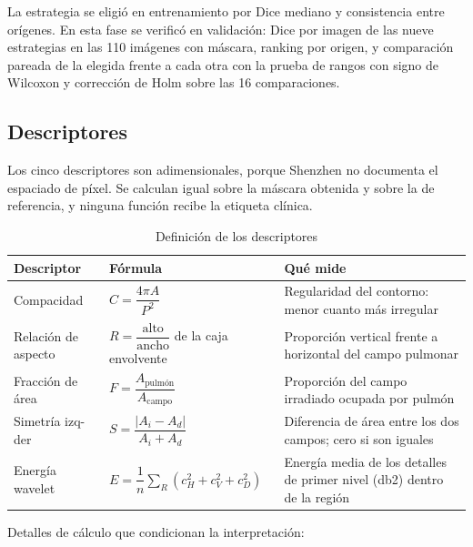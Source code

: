 La estrategia se eligió en entrenamiento por Dice mediano y consistencia entre
orígenes. En esta fase se verificó en validación: Dice por imagen de las nueve
estrategias en las 110 imágenes con máscara, ranking por origen, y comparación
pareada de la elegida frente a cada otra con la prueba de rangos con signo de
Wilcoxon y corrección de Holm sobre las 16 comparaciones.

\subsection{Descriptores}
\label{sec:met-descriptores}

Los cinco descriptores son adimensionales, porque Shenzhen no documenta el
espaciado de píxel. Se calculan igual sobre la máscara obtenida y sobre la de
referencia, y ninguna función recibe la etiqueta clínica.

\begin{table}[H]
\centering
\small
\caption{Definición de los descriptores}
\begin{tabular}{@{}p{3.5cm}p{4.6cm}p{5.6cm}@{}}
\toprule
\textbf{Descriptor} & \textbf{Fórmula} & \textbf{Qué mide} \\
\midrule
Compacidad & $C = \dfrac{4\pi A}{P^2}$ & Regularidad del contorno: menor cuanto
más irregular \\
\addlinespace
Relación de aspecto & $R = \dfrac{\text{alto}}{\text{ancho}}$ de la caja envolvente &
Proporción vertical frente a horizontal del campo pulmonar \\
\addlinespace
Fracción de área & $F = \dfrac{A_{\text{pulmón}}}{A_{\text{campo}}}$ & Proporción
del campo irradiado ocupada por pulmón \\
\addlinespace
Simetría izq-der & $S = \dfrac{|A_i - A_d|}{A_i + A_d}$ & Diferencia de área entre
los dos campos; cero si son iguales \\
\addlinespace
Energía wavelet & $E = \dfrac{1}{n}\sum_{R} \left(c_H^2 + c_V^2 + c_D^2\right)$ &
Energía media de los detalles de primer nivel (db2) dentro de la región \\
\bottomrule
\end{tabular}
\end{table}

Detalles de cálculo que condicionan la interpretación:

